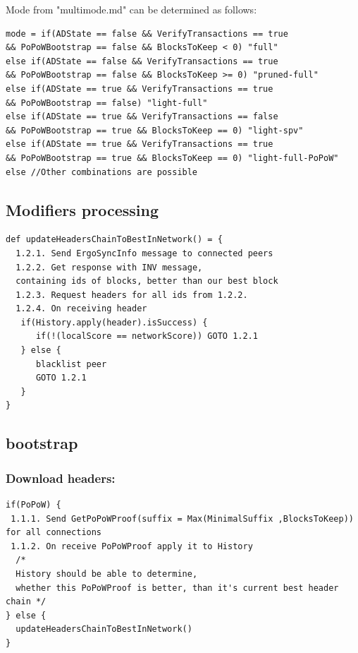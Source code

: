 \documentclass[]{article}   %
\begin{document}
\begin{enumerate}
\begin{itemize}
\end{itemize}
Mode from "multimode.md" can be determined as follows:
\begin{verbatim}
mode = if(ADState == false && VerifyTransactions == true
&& PoPoWBootstrap == false && BlocksToKeep < 0) "full"
else if(ADState == false && VerifyTransactions == true
&& PoPoWBootstrap == false && BlocksToKeep >= 0) "pruned-full"
else if(ADState == true && VerifyTransactions == true
&& PoPoWBootstrap == false) "light-full"
else if(ADState == true && VerifyTransactions == false
&& PoPoWBootstrap == true && BlocksToKeep == 0) "light-spv"
else if(ADState == true && VerifyTransactions == true
&& PoPoWBootstrap == true && BlocksToKeep == 0) "light-full-PoPoW"
else //Other combinations are possible
\end{verbatim}
\end{enumerate}
\subsection{Modifiers processing}
\begin{verbatim}
def updateHeadersChainToBestInNetwork() = {
  1.2.1. Send ErgoSyncInfo message to connected peers
  1.2.2. Get response with INV message,
  containing ids of blocks, better than our best block
  1.2.3. Request headers for all ids from 1.2.2.
  1.2.4. On receiving header
   if(History.apply(header).isSuccess) {
      if(!(localScore == networkScore)) GOTO 1.2.1
   } else {
      blacklist peer
      GOTO 1.2.1
   }
}
\end{verbatim}

\subsection{bootstrap}
\subsubsection{Download headers:}
\begin{verbatim}
if(PoPoW) {
 1.1.1. Send GetPoPoWProof(suffix = Max(MinimalSuffix ,BlocksToKeep)) for all connections
 1.1.2. On receive PoPoWProof apply it to History
  /*
  History should be able to determine,
  whether this PoPoWProof is better, than it's current best header chain */
} else {
  updateHeadersChainToBestInNetwork()
}
\end{verbatim}
\end{document}
